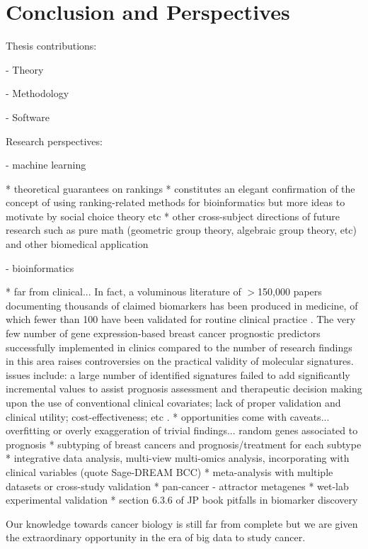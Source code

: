 \chapter{Conclusion and Perspectives}
\label{chap:conclusion}

Thesis contributions:

- Theory

- Methodology

- Software

Research perspectives:

- machine learning

* theoretical guarantees on rankings
* constitutes an elegant confirmation of the concept of using ranking-related methods for bioinformatics but more ideas to motivate by social choice theory etc
* other cross-subject directions of future research such as pure math (geometric group theory, algebraic group theory, etc) and other biomedical application

- bioinformatics

* far from clinical... In fact, a voluminous literature of $>$150,000 papers documenting thousands of claimed biomarkers has been produced in medicine, of which fewer than 100 have been validated for routine clinical practice \cite{Poste2011Bring}. The very few number of gene expression-based breast cancer prognostic predictors successfully implemented in clinics compared to the number of research findings in this area raises controversies on the practical validity of molecular signatures. issues include: a large number of identified signatures failed to add significantly incremental values to assist prognosis assessment and therapeutic decision making upon the use of conventional clinical covariates; lack of proper validation and clinical utility; cost-effectiveness; etc \cite{Michiels2016Statistical}.
* opportunities come with caveats... overfitting or overly exaggeration of trivial findings... random genes associated to prognosis \cite{Venet2011Most}
* subtyping of breast cancers and prognosis/treatment for each subtype
* integrative data analysis, multi-view multi-omics analysis, incorporating with clinical variables (quote Sage-DREAM BCC)
* meta-analysis with multiple datasets or cross-study validation
* pan-cancer - attractor metagenes
* wet-lab experimental validation
* section 6.3.6 of JP book pitfalls in biomarker discovery

Our knowledge towards cancer biology is still far from complete but we are given the extraordinary opportunity in the era of big data to study cancer.

